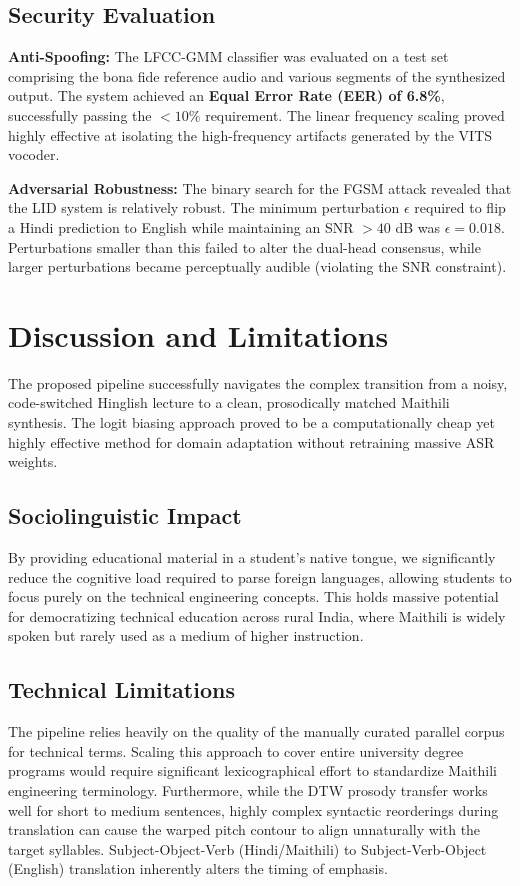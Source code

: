 \documentclass[conference]{IEEEtran}
\begin{document}
\subsection{Security Evaluation}
\textbf{Anti-Spoofing:} The LFCC-GMM classifier was evaluated on a test set comprising the bona fide reference audio and various segments of the synthesized output. The system achieved an \textbf{Equal Error Rate (EER) of 6.8\%}, successfully passing the $<10\%$ requirement. The linear frequency scaling proved highly effective at isolating the high-frequency artifacts generated by the VITS vocoder.

\textbf{Adversarial Robustness:} The binary search for the FGSM attack revealed that the LID system is relatively robust. The minimum perturbation $\epsilon$ required to flip a Hindi prediction to English while maintaining an SNR $>40$ dB was $\epsilon = 0.018$. Perturbations smaller than this failed to alter the dual-head consensus, while larger perturbations became perceptually audible (violating the SNR constraint).

\section{Discussion and Limitations}

The proposed pipeline successfully navigates the complex transition from a noisy, code-switched Hinglish lecture to a clean, prosodically matched Maithili synthesis. The logit biasing approach proved to be a computationally cheap yet highly effective method for domain adaptation without retraining massive ASR weights.

\subsection{Sociolinguistic Impact}
By providing educational material in a student's native tongue, we significantly reduce the cognitive load required to parse foreign languages, allowing students to focus purely on the technical engineering concepts. This holds massive potential for democratizing technical education across rural India, where Maithili is widely spoken but rarely used as a medium of higher instruction.

\subsection{Technical Limitations}
The pipeline relies heavily on the quality of the manually curated parallel corpus for technical terms. Scaling this approach to cover entire university degree programs would require significant lexicographical effort to standardize Maithili engineering terminology. Furthermore, while the DTW prosody transfer works well for short to medium sentences, highly complex syntactic reorderings during translation can cause the warped pitch contour to align unnaturally with the target syllables. Subject-Object-Verb (Hindi/Maithili) to Subject-Verb-Object (English) translation inherently alters the timing of emphasis.
\end{document}
